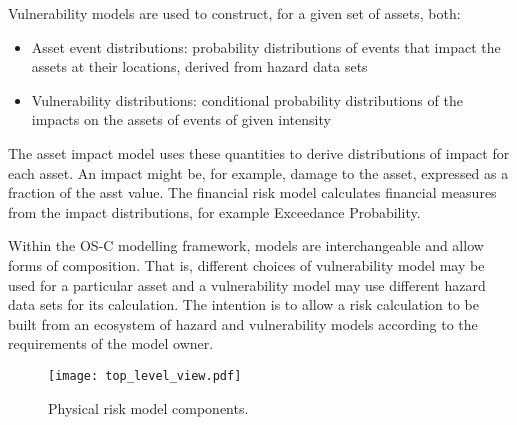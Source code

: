 \documentclass{article}
\begin{document}
Vulnerability models are used to construct, for a given set of assets, both:
\begin{itemize}
    \item Asset event distributions: probability distributions of events that impact the assets at their locations, derived from hazard data sets
    \item Vulnerability distributions: conditional probability distributions of the impacts on the assets of events of given intensity
\end{itemize}

The asset impact model uses these quantities to derive distributions of impact for each asset. An impact might be, for example, damage to the asset, expressed as a fraction of the asst value. The financial risk model calculates financial measures from the impact distributions, for example Exceedance Probability.

Within the OS-C modelling framework, models are interchangeable and allow forms of composition. That is, different choices of vulnerability model may be used for a particular asset and a vulnerability model may use different hazard data sets for its calculation. The intention is to allow a risk calculation to be built from an ecosystem of hazard and vulnerability models according to the requirements of the model owner.

\begin{figure}[ht]

    \begin{framed}
        \texttt{[image: top\_level\_view.pdf]}


    \end{framed}

    \footnotesize

    \renewcommand{\arraystretch}{1.01}

    \vspace{-3ex}

    \vspace{-0.5ex}

    \caption{\small Physical risk model components. }
    \label{Fig:top_level_view}

\end{figure}
\end{document}
